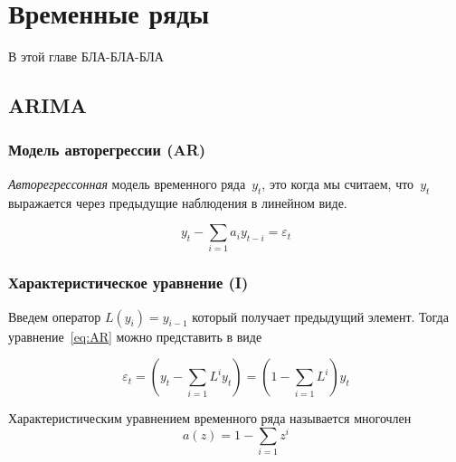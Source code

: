 \documentclass[../handbook.tex]{subfiles}
\begin{document}
\chapter{Временные ряды}

В этой главе БЛА-БЛА-БЛА

\section{ARIMA}

\subsection{Модель авторегрессии (AR)}
\emph{Авторегрессонная} модель временного ряда~$y_t$, это когда мы считаем, что~$y_t$ выражается через предыдущие наблюдения в линейном виде.

\begin{equation}
    \label{eq:AR}
    y_t - \sum_{i=1} a_i y_{t-i} = \varepsilon_t
\end{equation}

\subsection{Характеристическое уравнение (I)}
Введем оператор $L(y_i) = y_{i-1}$ который получает предыдущий элемент. Тогда уравнение~\eqref{eq:AR} можно представить в виде

\begin{equation}
    \varepsilon_t = \left(y_t - \sum_{i=1}L^i y_t\right) =  (1 - \sum_{i=1}L^i) y_t
\end{equation}

Характеристическим уравнением временного ряда называется многочлен
\begin{equation}
    \label{eq:ts:character}
    a(z) = 1 - \sum_{i=1}z^i
\end{equation}
\end{document}
